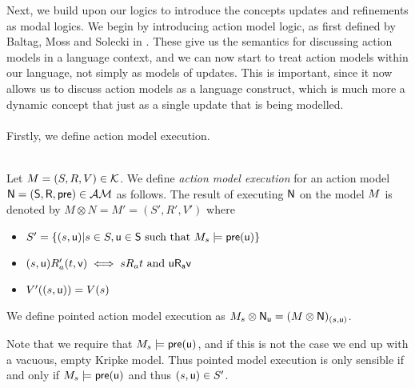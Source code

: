 Next, we build upon our logics to introduce the concepts updates and refinements as modal logics.
We begin by introducing action model logic, as first defined by Baltag, Moss and Solecki in
\cite{baltag1998lpa}.
These give us the semantics for discussing action models in a language context, and we can now start
to treat action models within our language, not simply as models of updates.
This is important, since it now allows us to discuss action models as a language construct, which is
much more a dynamic concept that just as a single update that is being modelled.\\
\\
Firstly, we define action model execution.\\
\\
\begin{defn} \label{evModelEx}
	Let $M = (S, R, V) \in \mathcal{K}$. We define {\em action model
	execution} for an action model $\mathrm{\mathsf{\mathrm{\mathsf{N}} = (S,
		R, pre)}} \in
\mathcal{AM}$ as follows.
The result of executing $\mathrm{\mathsf{N}}$ on the model $M$ is denoted by $M \otimes N = M' = (S', R', V')$ where
\begin{itemize}
	\item $S' = \{(s,\mathrm{\mathsf{u}}) | s \in S, \mathrm{\mathsf{u \in
    S}} \text{ such that } M_s \models \mathrm{\mathsf{pre(u)}}\}$
	\item $(s, \mathrm{\mathsf{u}}) R_a' (t, \mathrm{\mathsf{v}}) \iff s R_a t \text{ and } \mathrm{\mathsf{u R_a v}}$
	\item $V'((s,\mathrm{\mathsf{u}})) = V(s)$
\end{itemize}
We define pointed action model execution as $M_s \otimes
\mathrm{\mathsf{\mathrm{\mathsf{N}}_u}}
= (M \otimes \mathrm{\mathsf{\mathrm{\mathsf{N}}}})_{(s, \mathrm{\mathsf{u}})}$.
\end{defn}

Note that we require that $M_s \models \mathrm{\mathsf{pre(u)}}$, and if this is not the case we end up with a
vacuous, empty Kripke model.
Thus pointed model execution is only sensible if and only if $M_s \models
\mathrm{\mathsf{pre(u)}}$ and thus $(s,\mathrm{\mathsf{u}})
	\in S'$.

